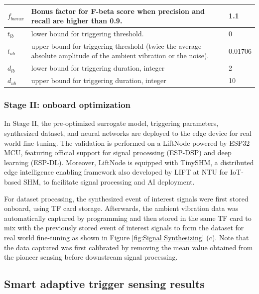 \documentclass[a4paper,fleqn,numbers,sort&compress]{cas-sc}
\begin{document}
\begin{table}[h!]
{\begin{tabular}{|p{}|p{}|p{}|}
    $f_{bonux}$ & Bonus factor for F-beta score when precision and recall are higher than 0.9. & 1.1 \\ \hline
    $t_{lb}$ & lower bound for triggering threshold. & 0 \\ \hline
    $t_{ub}$ & upper bound for triggering threshold (twice the average absolute amplitude of the ambient vibration or the noise). & 0.01706 \\ \hline
    $d_{lb}$ & lower bound for triggering duration, integer & 2 \\ \hline
    $d_{ub}$ & upper bound for triggering duration, integer & 10 \\ \hline
    \end{tabular}
    } %
\end{table}

\subsubsection{Stage II: onboard optimization}

In Stage II, the pre-optimized surrogate model, triggering parameters, synthesized dataset, and neural networks are deployed to the edge device for real world fine-tuning. The validation is performed on a LiftNode powered by ESP32 MCU, featuring official support for signal processing (ESP-DSP) and deep learning (ESP-DL). Moreover, LiftNode is equipped with TinySHM, a distributed edge intelligence enabling framework also developed by LIFT at NTU for IoT-based SHM, to facilitate signal processing and AI deployment.

For dataset processing, the synthesized event of interest signals were first stored onboard, using TF card storage. Afterwards, the ambient vibration data was automatically captured by programming and then stored in the same TF card to mix with the previously stored event of interest signals to form the dataset for real world fine-tuning as shown in Figure \ref{fig:Signal Synthesizing} (c). Note that the data captured was first calibrated by removing the mean value obtained from the pioneer sensing before downstream signal processing.

\subsection{Smart adaptive trigger sensing results}
\end{document}
